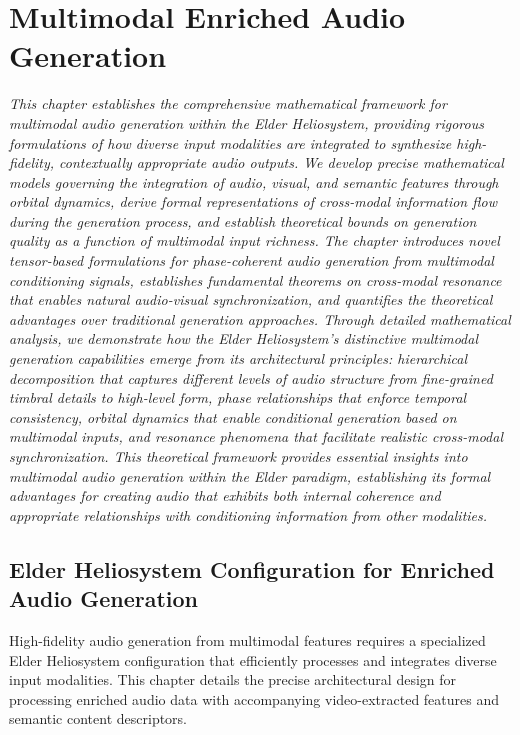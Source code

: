 \chapter{Multimodal Enriched Audio Generation}

\textit{This chapter establishes the comprehensive mathematical framework for multimodal audio generation within the Elder Heliosystem, providing rigorous formulations of how diverse input modalities are integrated to synthesize high-fidelity, contextually appropriate audio outputs. We develop precise mathematical models governing the integration of audio, visual, and semantic features through orbital dynamics, derive formal representations of cross-modal information flow during the generation process, and establish theoretical bounds on generation quality as a function of multimodal input richness. The chapter introduces novel tensor-based formulations for phase-coherent audio generation from multimodal conditioning signals, establishes fundamental theorems on cross-modal resonance that enables natural audio-visual synchronization, and quantifies the theoretical advantages over traditional generation approaches. Through detailed mathematical analysis, we demonstrate how the Elder Heliosystem's distinctive multimodal generation capabilities emerge from its architectural principles: hierarchical decomposition that captures different levels of audio structure from fine-grained timbral details to high-level form, phase relationships that enforce temporal consistency, orbital dynamics that enable conditional generation based on multimodal inputs, and resonance phenomena that facilitate realistic cross-modal synchronization. This theoretical framework provides essential insights into multimodal audio generation within the Elder paradigm, establishing its formal advantages for creating audio that exhibits both internal coherence and appropriate relationships with conditioning information from other modalities.}

\section{Elder Heliosystem Configuration for Enriched Audio Generation}

High-fidelity audio generation from multimodal features requires a specialized Elder Heliosystem configuration that efficiently processes and integrates diverse input modalities. This chapter details the precise architectural design for processing enriched audio data with accompanying video-extracted features and semantic content descriptors.

